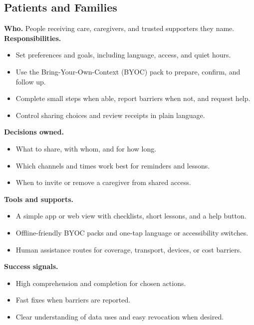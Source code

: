 \documentclass[12pt]{article}
\begin{document}
\subsection*{Patients and Families}
\textbf{Who.} People receiving care, caregivers, and trusted supporters they name.\\
\textbf{Responsibilities.}
\begin{itemize}[leftmargin=*]
  \item Set preferences and goals, including language, access, and quiet hours.
  \item Use the Bring-Your-Own-Context (BYOC) pack to prepare, confirm, and follow up.
  \item Complete small steps when able, report barriers when not, and request help.
  \item Control sharing choices and review receipts in plain language.
\end{itemize}
\textbf{Decisions owned.}
\begin{itemize}[leftmargin=*]
  \item What to share, with whom, and for how long.
  \item Which channels and times work best for reminders and lessons.
  \item When to invite or remove a caregiver from shared access.
\end{itemize}
\textbf{Tools and supports.}
\begin{itemize}[leftmargin=*]
  \item A simple app or web view with checklists, short lessons, and a help button.
  \item Offline-friendly BYOC packs and one-tap language or accessibility switches.
  \item Human assistance routes for coverage, transport, devices, or cost barriers.
\end{itemize}
\textbf{Success signals.}
\begin{itemize}[leftmargin=*]
  \item High comprehension and completion for chosen actions.
  \item Fast fixes when barriers are reported.
  \item Clear understanding of data uses and easy revocation when desired.
\end{itemize}
\end{document}
